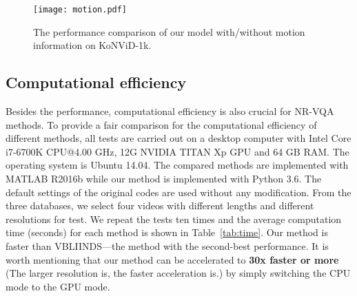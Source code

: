 \documentclass[sigconf]{acmart}
\begin{document}
\begin{figure}[!htb]
\begin{center}
   \texttt{[image: motion.pdf]}
\end{center}
   \caption{The performance comparison of our model with/without motion information on KoNViD-1k.}
\label{fig:motion}
\end{figure}

\subsection{Computational efficiency}
Besides the performance, computational efficiency is also crucial for NR-VQA methods. To provide a fair comparison for the computational efficiency of different methods, all tests are carried out on a desktop computer with Intel Core i7-6700K CPU@4.00 GHz, 12G NVIDIA TITAN Xp GPU and 64 GB RAM. The operating system is Ubuntu 14.04. The compared methods are implemented with MATLAB R2016b while our method is implemented with Python 3.6. The default settings of the original codes are used without any modification. From the three databases, we select four videos with different lengths and different resolutions for test. We repeat the tests ten times and the average computation time (seconds) for each method is shown in Table~\ref{tab:time}. Our method is faster than VBLIINDS---the method with the second-best performance. It is worth mentioning that our method can be accelerated to \textbf{30x faster or more} (The larger resolution is, the faster acceleration is.) by simply switching the CPU mode to the GPU mode.


\begin{table}[!hbt]
    \centering
    \caption{The average computation time (seconds) for four videos selected from the original databases. \{xxx\}frs@\{yyy\}p indicates the video frame length and the resolution.}
    \label{tab:time}
    \begin{small}
    \end{small}
\end{table}
\end{document}
